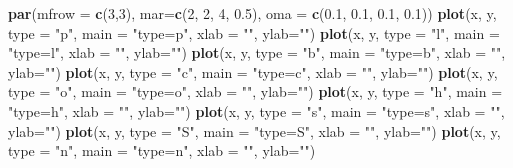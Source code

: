 \documentclass[
]{book}
\newenvironment{Shaded}{\begin{snugshade}}{\end{snugshade}}
\newcommand{\AttributeTok}[1]{\textcolor[rgb]{0.13,0.29,0.53}{#1}}
\newcommand{\DecValTok}[1]{\textcolor[rgb]{0.00,0.00,0.81}{#1}}
\newcommand{\FloatTok}[1]{\textcolor[rgb]{0.00,0.00,0.81}{#1}}
\newcommand{\FunctionTok}[1]{\textcolor[rgb]{0.13,0.29,0.53}{\textbf{#1}}}
\newcommand{\NormalTok}[1]{#1}
\newcommand{\StringTok}[1]{\textcolor[rgb]{0.31,0.60,0.02}{#1}}
\begin{document}
\begin{Shaded}
\begin{Highlighting}[]
\FunctionTok{par}\NormalTok{(}\AttributeTok{mfrow =} \FunctionTok{c}\NormalTok{(}\DecValTok{3}\NormalTok{,}\DecValTok{3}\NormalTok{), }\AttributeTok{mar=}\FunctionTok{c}\NormalTok{(}\DecValTok{2}\NormalTok{, }\DecValTok{2}\NormalTok{, }\DecValTok{4}\NormalTok{, }\FloatTok{0.5}\NormalTok{), }\AttributeTok{oma =} \FunctionTok{c}\NormalTok{(}\FloatTok{0.1}\NormalTok{, }\FloatTok{0.1}\NormalTok{, }\FloatTok{0.1}\NormalTok{, }\FloatTok{0.1}\NormalTok{))}
\FunctionTok{plot}\NormalTok{(x, y, }\AttributeTok{type =} \StringTok{"p"}\NormalTok{, }\AttributeTok{main =} \StringTok{"type=\textquotesingle{}p\textquotesingle{}"}\NormalTok{, }\AttributeTok{xlab =} \StringTok{""}\NormalTok{, }\AttributeTok{ylab=}\StringTok{""}\NormalTok{)}
\FunctionTok{plot}\NormalTok{(x, y, }\AttributeTok{type =} \StringTok{"l"}\NormalTok{, }\AttributeTok{main =} \StringTok{"type=\textquotesingle{}l\textquotesingle{}"}\NormalTok{, }\AttributeTok{xlab =} \StringTok{""}\NormalTok{, }\AttributeTok{ylab=}\StringTok{""}\NormalTok{)}
\FunctionTok{plot}\NormalTok{(x, y, }\AttributeTok{type =} \StringTok{"b"}\NormalTok{, }\AttributeTok{main =} \StringTok{"type=\textquotesingle{}b\textquotesingle{}"}\NormalTok{, }\AttributeTok{xlab =} \StringTok{""}\NormalTok{, }\AttributeTok{ylab=}\StringTok{""}\NormalTok{)}
\FunctionTok{plot}\NormalTok{(x, y, }\AttributeTok{type =} \StringTok{"c"}\NormalTok{, }\AttributeTok{main =} \StringTok{"type=\textquotesingle{}c\textquotesingle{}"}\NormalTok{, }\AttributeTok{xlab =} \StringTok{""}\NormalTok{, }\AttributeTok{ylab=}\StringTok{""}\NormalTok{)}
\FunctionTok{plot}\NormalTok{(x, y, }\AttributeTok{type =} \StringTok{"o"}\NormalTok{, }\AttributeTok{main =} \StringTok{"type=\textquotesingle{}o\textquotesingle{}"}\NormalTok{, }\AttributeTok{xlab =} \StringTok{""}\NormalTok{, }\AttributeTok{ylab=}\StringTok{""}\NormalTok{)}
\FunctionTok{plot}\NormalTok{(x, y, }\AttributeTok{type =} \StringTok{"h"}\NormalTok{, }\AttributeTok{main =} \StringTok{"type=\textquotesingle{}h\textquotesingle{}"}\NormalTok{, }\AttributeTok{xlab =} \StringTok{""}\NormalTok{, }\AttributeTok{ylab=}\StringTok{""}\NormalTok{)}
\FunctionTok{plot}\NormalTok{(x, y, }\AttributeTok{type =} \StringTok{"s"}\NormalTok{, }\AttributeTok{main =} \StringTok{"type=\textquotesingle{}s\textquotesingle{}"}\NormalTok{, }\AttributeTok{xlab =} \StringTok{""}\NormalTok{, }\AttributeTok{ylab=}\StringTok{""}\NormalTok{)}
\FunctionTok{plot}\NormalTok{(x, y, }\AttributeTok{type =} \StringTok{"S"}\NormalTok{, }\AttributeTok{main =} \StringTok{"type=\textquotesingle{}S\textquotesingle{}"}\NormalTok{, }\AttributeTok{xlab =} \StringTok{""}\NormalTok{, }\AttributeTok{ylab=}\StringTok{""}\NormalTok{)}
\FunctionTok{plot}\NormalTok{(x, y, }\AttributeTok{type =} \StringTok{"n"}\NormalTok{, }\AttributeTok{main =} \StringTok{"type=\textquotesingle{}n\textquotesingle{}"}\NormalTok{, }\AttributeTok{xlab =} \StringTok{""}\NormalTok{, }\AttributeTok{ylab=}\StringTok{""}\NormalTok{)}
\end{Highlighting}
\end{Shaded}
\end{document}
